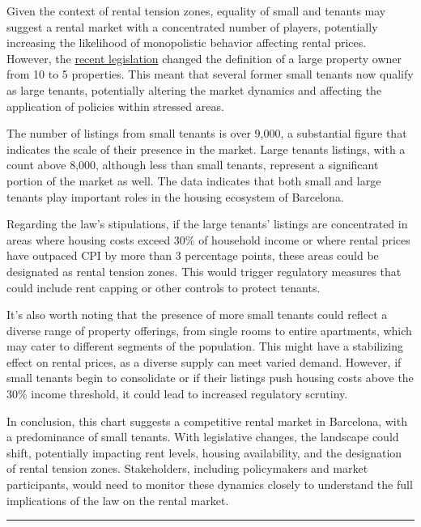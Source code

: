 \documentclass[
]{article}
\begin{document}
Given the context of rental tension zones, equality of small and tenants
may suggest a rental market with a concentrated number of players,
potentially increasing the likelihood of monopolistic behavior affecting
rental prices. However, the
\href{https://www.boe.es/buscar/act.php?id=BOE-A-2023-12203}{recent
legislation} changed the definition of a large property owner from 10 to
5 properties. This meant that several former small tenants now qualify
as large tenants, potentially altering the market dynamics and affecting
the application of policies within stressed areas.

The number of listings from small tenants is over 9,000, a substantial
figure that indicates the scale of their presence in the market. Large
tenants listings, with a count above 8,000, although less than small
tenants, represent a significant portion of the market as well. The data
indicates that both small and large tenants play important roles in the
housing ecosystem of Barcelona.

Regarding the law's stipulations, if the large tenants' listings are
concentrated in areas where housing costs exceed 30\% of household
income or where rental prices have outpaced CPI by more than 3
percentage points, these areas could be designated as rental tension
zones. This would trigger regulatory measures that could include rent
capping or other controls to protect tenants.

It's also worth noting that the presence of more small tenants could
reflect a diverse range of property offerings, from single rooms to
entire apartments, which may cater to different segments of the
population. This might have a stabilizing effect on rental prices, as a
diverse supply can meet varied demand. However, if small tenants begin
to consolidate or if their listings push housing costs above the 30\%
income threshold, it could lead to increased regulatory scrutiny.

In conclusion, this chart suggests a competitive rental market in
Barcelona, with a predominance of small tenants. With legislative
changes, the landscape could shift, potentially impacting rent levels,
housing availability, and the designation of rental tension zones.
Stakeholders, including policymakers and market participants, would need
to monitor these dynamics closely to understand the full implications of
the law on the rental market.

\begin{center}\rule{0.5\linewidth}{0.5pt}\end{center}
\end{document}
